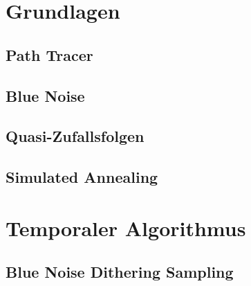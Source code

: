 \vfill
\chapter{Grundlagen}
\label{ch:Grundlagen}


\section{Path Tracer}
\label{ch:Content1:sec:PathTracer}



\newpage
\section{Blue Noise}
\label{ch:Content1:sec:BlueNoise}



\newpage
\section{Quasi-Zufallsfolgen}
\label{ch:Content1:sec:QuasiRandomSequences}



\newpage
\section{Simulated Annealing}
\label{ch:Content2:sec:SimulatedAnnealing}




\newpage
\chapter{Temporaler Algorithmus}
\label{ch:TemporalerAlgorithmus}


\section{Blue Noise Dithering Sampling}
\label{ch:Content1:sec:BlueNoiseSampling}


